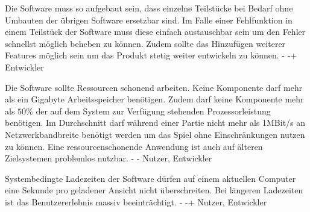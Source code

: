         {Die Software muss so aufgebaut sein, dass einzelne Teilstücke bei Bedarf ohne Umbauten der übrigen Software ersetzbar sind.}
        {Im Falle einer Fehlfunktion in einem Teilstück der Software muss diese einfach austauschbar sein um den Fehler schnellst möglich beheben zu können. Zudem sollte das Hinzufügen weiterer Features möglich sein um das Produkt stetig weiter entwickeln zu können.}
        {-}
        {-+}
        {Entwickler}

        {Die Software sollte Ressourcen schonend arbeiten. Keine Komponente darf mehr als ein Gigabyte Arbeitsspeicher benötigen. Zudem darf keine Komponente mehr als $50\%$ der auf dem System zur Verfügung stehenden Prozessorleistung benötigen. Im Durchschnitt darf während einer Partie nicht mehr als 1MBit/s an Netzwerkbandbreite benötigt werden um das Spiel ohne Einschränkungen nutzen zu können.}
        {Eine ressourcenschonende Anwendung ist auch auf älteren Zielsystemen problemlos nutzbar.}
        {-}
        {-}
        {Nutzer, Entwickler}

        {Systembedingte Ladezeiten der Software dürfen auf einem aktuellen Computer eine Sekunde pro geladener Ansicht nicht überschreiten.}
        {Bei längeren Ladezeiten ist das Benutzererlebnis massiv beeinträchtigt.}
        {-}
        {-+}
        {Nutzer, Entwickler}

